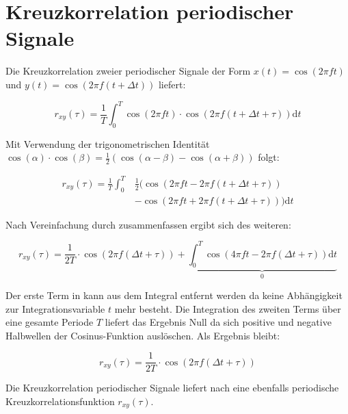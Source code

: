 
\chapter{Kreuzkorrelation periodischer Signale}
\label{appx:KreuzkorrelationPeriodischerSignale} 
Die Kreuzkorrelation zweier periodischer Signale der Form $x(t)=\cos(2\pi ft)$ und  $y(t) = \cos(2\pi f (t+\Delta t))$ liefert:

\begin{equation}
\label{eq:KorrPeriodisch1}
r_{xy}(\tau) =\frac{1}{T} \int_{0}^{T} \cos(2\pi ft) \cdot \cos(2\pi f (t+\Delta t+\tau)) \mathrm dt
\end{equation}

Mit Verwendung der trigonometrischen Identität $\cos(\alpha) \cdot \cos(\beta) = \frac{1}{2}\left(\cos(\alpha - \beta) - \cos(\alpha + \beta)\right)$ folgt:

\begin{equation}\label{eq:KorrPeriodisch2}
    \begin{split}
r_{xy}(\tau) = \frac{1}{T} \int_{0}^{T} & \frac{1}{2} ( \cos{(2\pi ft - 2\pi f (t+\Delta t+\tau))} \\ & - \cos{(2\pi ft + 2\pi f (t+\Delta t+\tau))} ) \mathrm dt
    \end{split}
\end{equation}

Nach Vereinfachung durch zusammenfassen ergibt sich des weiteren:

\begin{equation}
\label{eq:KorrPeriodisch3}
r_{xy}(\tau) = \frac{1}{2T} \cdot \cos{(2\pi f (\Delta t+\tau))} + \underbrace{\int_{0}^{T}  \cos(4\pi ft - 2\pi f (\Delta t+\tau))\mathrm dt}_{0}
\end{equation}

Der erste Term in  kann aus dem Integral entfernt werden da keine Abhängigkeit zur Integrationsvariable $t$ mehr besteht. Die Integration des zweiten Terms über eine gesamte Periode $T$ liefert das Ergebnis Null da sich positive und negative Halbwellen der Cosinus-Funktion auslöschen. Als Ergebnis bleibt:

\begin{equation}
\label{eq:KorrPeriodisch4}
r_{xy}(\tau) = \frac{1}{2T} \cdot \cos(2\pi f (\Delta t+\tau))
\end{equation}

Die Kreuzkorrelation periodischer Signale liefert nach  eine ebenfalls periodische Kreuzkorrelationsfunktion $r_{xy}(\tau)$.